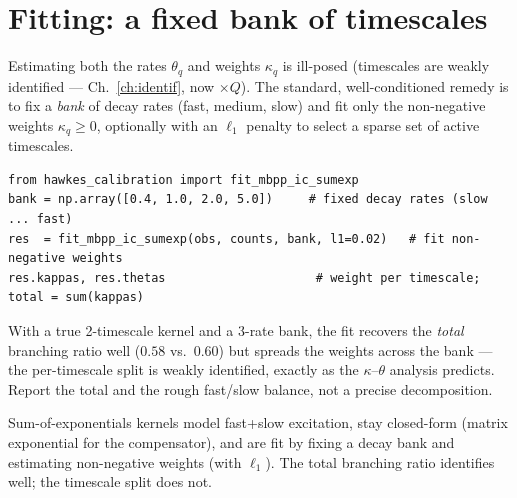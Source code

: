 \section{Fitting: a fixed bank of timescales}

\begin{whybox}
Estimating both the rates $\theta_q$ and weights $\kappa_q$ is ill-posed
(timescales are weakly identified --- Ch.~\ref{ch:identif}, now $\times Q$). The
standard, well-conditioned remedy is to fix a \emph{bank} of decay rates (fast,
medium, slow) and fit only the non-negative weights $\kappa_q\ge0$, optionally with
an $\ell_1$ penalty to select a sparse set of active timescales.
\end{whybox}

\begin{lstlisting}[caption={Multi-timescale fit over a fixed decay bank.}]
from hawkes_calibration import fit_mbpp_ic_sumexp
bank = np.array([0.4, 1.0, 2.0, 5.0])     # fixed decay rates (slow ... fast)
res  = fit_mbpp_ic_sumexp(obs, counts, bank, l1=0.02)   # fit non-negative weights
res.kappas, res.thetas                     # weight per timescale; total = sum(kappas)
\end{lstlisting}

\begin{examplebox}
With a true 2-timescale kernel and a 3-rate bank, the fit recovers the \emph{total}
branching ratio well ($0.58$ vs.\ $0.60$) but spreads the weights across the bank ---
the per-timescale split is weakly identified, exactly as the $\kappa$--$\theta$
analysis predicts. Report the total and the rough fast/slow balance, not a precise
decomposition.
\end{examplebox}

\begin{recap}
Sum-of-exponentials kernels model fast+slow excitation, stay closed-form (matrix
exponential for the compensator), and are fit by fixing a decay bank and estimating
non-negative weights (with $\ell_1$). The total branching ratio identifies well;
the timescale split does not.
\end{recap}

